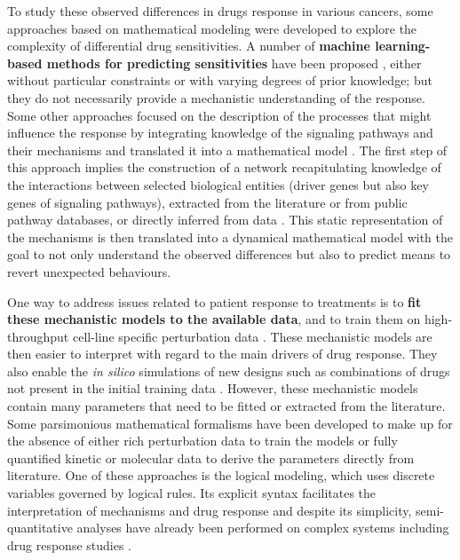 \documentclass[a4paper,12pt,twoside,onecolumn,openright,final,oldfontcommands]{memoir}
\begin{document}
To study these observed differences in drugs response in various
cancers, some approaches based on mathematical modeling were developed
to explore the complexity of differential drug sensitivities. A number
of \textbf{machine learning-based methods for predicting sensitivities}
have been proposed \citep{costello2014community}, either without
particular constraints or with varying degrees of prior knowledge; but
they do not necessarily provide a mechanistic understanding of the
response. Some other approaches focused on the description of the
processes that might influence the response by integrating knowledge of
the signaling pathways and their mechanisms and translated it into a
mathematical model
\citep{eduati2017drug, jastrzebski2018integrative, frohlich2018efficient}.
The first step of this approach implies the construction of a network
recapitulating knowledge of the interactions between selected biological
entities (driver genes but also key genes of signaling pathways),
extracted from the literature or from public pathway databases, or
directly inferred from data \citep{verny2017learning}. This static
representation of the mechanisms is then translated into a dynamical
mathematical model with the goal to not only understand the observed
differences \citep{jastrzebski2018integrative} but also to predict means
to revert unexpected behaviours.

One way to address issues related to patient response to treatments is
to \textbf{fit these mechanistic models to the available data}, and to
train them on high-throughput cell-line specific perturbation data
\citep{eduati2017drug, jastrzebski2018integrative, klinger2013network}.
These mechanistic models are then easier to interpret with regard to the
main drivers of drug response. They also enable the \emph{in silico}
simulations of new designs such as combinations of drugs not present in
the initial training data \citep{frohlich2018efficient}. However, these
mechanistic models contain many parameters that need to be fitted or
extracted from the literature. Some parsimonious mathematical formalisms
have been developed to make up for the absence of either rich
perturbation data to train the models or fully quantified kinetic or
molecular data to derive the parameters directly from literature. One of
these approaches is the logical modeling, which uses discrete variables
governed by logical rules. Its explicit syntax facilitates the
interpretation of mechanisms and drug response
\citep{zanudo2017network, iorio2016landscape} and despite its
simplicity, semi-quantitative analyses have already been performed on
complex systems including drug response studies
\citep{knijnenburg2016logic, eduati2020patient}.
\end{document}
